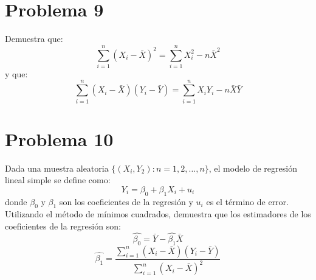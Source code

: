\documentclass[]{article}
\begin{document}
\section*{Problema 9}

Demuestra que: 
$$
\sum_{i=1}^{n}
(X_i-\bar{X})^2
=
\sum_{i=1}^{n}
X_{i}^{2}
-
n
\bar{X}^2
$$
y que: 
$$
\sum_{i=1}^{n}
(X_i-\bar{X})
(Y_i-\bar{Y})
=
\sum_{i=1}^{n}
X_iY_i
-
n
\bar{X}
\bar{Y}
$$

\section*{Problema 10}

Dada una muestra aleatoria
$\{(X_i, Y_2): n=1,2,\ldots,n\}$, el modelo de regresión lineal simple se define como:
$$
Y_i=
	\beta_0
	+
	\beta_1X_i
	+
	u_i
$$
donde $\beta_0$ y $\beta_1$ son los coeficientes de la regresión y $u_i$ es el término de error. Utilizando el método de mínimos cuadrados, demuestra que los estimadores de los coeficientes de la regresión son:
$$
\hat{\beta_0}=\bar{Y}-\hat{\beta_1}\bar{X}
$$
$$
\hat{\beta_1}
=
\frac
{
	\sum_{i=1}^{n}
	(X_i-\bar{X})
	(Y_i-\bar{Y})
}
{
	\sum_{i=1}^{n}
	(X_i-\bar{X})^2
}
$$
\end{document}
